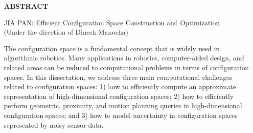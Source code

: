 \begin{center}
\vspace*{52pt}
{\Large \textbf{ABSTRACT}}
\vspace{11pt}
\begin{singlespace}
JIA PAN: Efficient Configuration Space Construction and Optimization\\
(Under the direction of Dinesh Manocha)
\end{singlespace}
\end{center}

The configuration space is a fundamental concept that is widely used in algorithmic robotics. Many applications in robotics, computer-aided design, and related areas can be reduced to computational problems in terms of configuration spaces. In this dissertation, we address three main computational challenges related to configuration spaces: 1) how to efficiently compute an approximate representation of high-dimensional configuration spaces; 2) how to efficiently perform geometric, proximity, and motion planning queries in high-dimensional configuration spaces; and 3) how to model uncertainty in configuration spaces represented by noisy sensor data.


